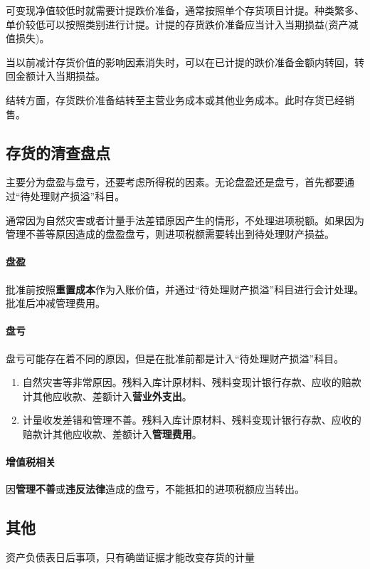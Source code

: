 \documentclass[UTF8,12pt]{ctexart}
\numberwithin{equation}{section} %
\numberwithin{figure}{section}
\numberwithin{table}{section}
\begin{document}
	可变现净值较低时就需要计提跌价准备，通常按照单个存货项目计提。种类繁多、单价较低可以按照类别进行计提。计提的存货跌价准备应当计入当期损益(资产减值损失)。
	
	当以前减计存货价值的影响因素消失时，可以在已计提的跌价准备金额内转回，转回金额计入当期损益。
	
	结转方面，存货跌价准备结转至主营业务成本或其他业务成本。此时存货已经销售。
	
	\subsection{存货的清查盘点}
	
	主要分为盘盈与盘亏，还要考虑所得税的因素。无论盘盈还是盘亏，首先都要通过“待处理财产损溢”科目。
	
	通常因为自然灾害或者计量手法差错原因产生的情形，不处理进项税额。如果因为管理不善等原因造成的盘盈盘亏，则进项税额需要转出到待处理财产损益。
	
	\paragraph{盘盈} 批准前按照\textbf{重置成本}作为入账价值，并通过“待处理财产损溢”科目进行会计处理。批准后冲减管理费用。
	
	\paragraph{盘亏} 盘亏可能存在着不同的原因，但是在批准前都是计入“待处理财产损溢”科目。
	\begin{enumerate}
		\item 自然灾害等非常原因。残料入库计原材料、残料变现计银行存款、应收的赔款计其他应收款、差额计入\textbf{营业外支出}。
		
		\item 计量收发差错和管理不善。残料入库计原材料、残料变现计银行存款、应收的赔款计其他应收款、差额计入\textbf{管理费用}。
		
	\end{enumerate}
	
	\paragraph{增值税相关}
	因\textbf{管理不善}或\textbf{违反法律}造成的盘亏，不能抵扣的进项税额应当转出。
	
	\subsection{其他}
	资产负债表日后事项，只有确凿证据才能改变存货的计量
	
\end{document}
